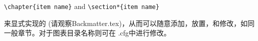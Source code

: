 \begin{enumerate}
        \verb+\chapter{item name}+  and \verb+\section*{item name}+

        来显式实现的 (请观察Backmatter.tex)，从而可以随意添加，放置，和修改，如同一般章节。对于图表目录名称则可在 \projectname.cfg中进行修改。


    
    
\end{enumerate}